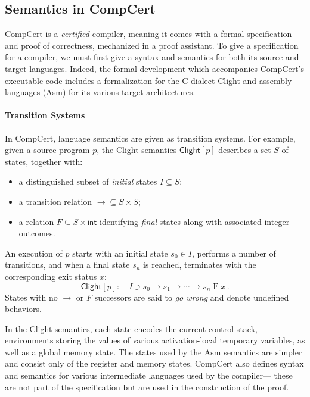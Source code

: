 \documentclass[acmsmall,screen,review,anonymous]{acmart}
\newcommand{\kw}[1]{\ensuremath{ \mathsf{#1} }}
\begin{document}
\subsection{Semantics in CompCert} %

CompCert is a \emph{certified} compiler,
meaning it comes with a formal specification
and proof of correctness,
mechanized in a proof assistant.
To give a specification for a compiler,
we must first give a syntax and semantics
for both its source and target languages.
Indeed,
the formal development which accompanies
CompCert's executable code
includes a formalization for the C dialect Clight
and assembly languages (Asm) for its various target architectures.

\paragraph{Transition Systems}

In CompCert,
language semantics are given as transition systems.
For example,
given a source program $p$,
the Clight semantics $\kw{Clight}[p]$
describes a set $S$ of states, together with:
\begin{itemize}
  \item a distinguished subset of \emph{initial} states $I \subseteq S$;
  \item a transition relation ${\rightarrow} \subseteq S \times S$;
  \item a relation $F \subseteq S \times \kw{int}$ identifying
    \emph{final} states along with associated integer outcomes.
\end{itemize}
An execution of $p$ starts with an initial state $s_0 \in I$,
performs a number of transitions,
and when a final state $s_n$ is reached,
terminates with the corresponding exit status $x$:
\begin{equation}
  \kw{Clight}[p] : \quad
  I \ni s_0 \rightarrow s_1 \rightarrow \cdots \rightarrow s_n \mathrel{F} x
  \,.
  \label{eqn:clightexec}
\end{equation}
States with no $\rightarrow$ or $F$ successors
are said to \emph{go wrong} and denote undefined behaviors.

In the Clight semantics,
each state encodes the current control stack,
environments storing the values of various activation-local temporary variables,
as well as a global memory state.
The states used by the Asm semantics
are simpler and consist only of the register and memory states.
CompCert also defines syntax and semantics for
various intermediate languages used by the compiler---%
these are not part of the specification but are used in the construction of the proof.
\end{document}
